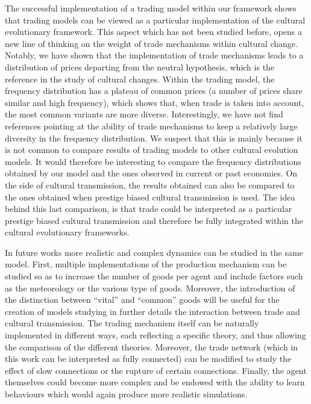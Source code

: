 \documentclass{wscpaperproc}
\begin{document}
The successful implementation of a trading model within our framework shows that trading models can be viewed as a particular implementation of the cultural evolutionary framework. This aspect which has not been studied before, opens a new line of thinking on the weight of trade mechanisms within cultural change. Notably, we have shown that the implementation of trade mechanisms leads to a distribution of prices departing from the neutral hypothesis, which is the reference in the study of cultural changes. Within the trading model, the frequency distribution has a plateau of common prices (a number of prices share similar and high frequency), which shows that, when trade is taken into account, the most common variants are more diverse. Interestingly, we have not find references pointing at the ability of trade mechanisms to keep a relatively large diversity in the frequency distribution. We suspect that this is mainly because it is not common to compare results of trading models to other cultural evolution models. It would therefore be interesting to compare the frequency distributions obtained by our model and the ones observed in current or past economies. On the side of cultural transmission, the results obtained can also be compared to the ones obtained when prestige biased cultural transmission is used. The idea behind this last comparison, is that trade could be interpreted as a particular prestige biased cultural transmission and therefore be fully integrated within the cultural evolutionary frameworks.

In future works more realistic and complex dynamics can be studied in the same model. First, multiple implementations of the production mechanism can be studied so as to increase the number of goods per agent and include factors such as the meteorology or the various type of goods. Moreover, the introduction of the distinction between ``vital'' and ``common'' goods will be useful for the creation of models studying in further details the interaction between trade and cultural transmission. The trading mechanism itself can be naturally implemented in different ways, each reflecting a specific theory, and thus allowing the comparison of the different theories. Moreover, the trade network (which in this work can be interpreted as fully connected) can be modified to study the effect of slow connections or the rupture of certain connections. Finally, the agent themselves could become more complex and be endowed with the ability to learn behaviours which would again produce more realistic simulations.
\end{document}
